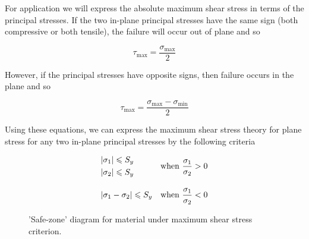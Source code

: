 \documentclass[
10pt,
a4paper,
openany,
svgnames,
]{book}
\begin{document}
For application we will express the absolute maximum shear stress in terms of the principal stresses. If the two in-plane principal stresses have the same sign (both compressive or both tensile), the failure will occur out of plane and so

\begin{equation}
  \tau _{\max } = \frac{\sigma _{\max }}{2}
\end{equation}

However, if the principal stresses have opposite signs, then failure occurs in the plane and so

\begin{equation}
  \tau _{\max } = \frac{\sigma_{\max } - \sigma _{\min }}{2}
\end{equation}

Using these equations, we can express the maximum shear stress theory for plane stress for any two in-plane principal stresses by the following criteria

\begin{equation}
  \begin{array}{l l}
    \begin{gathered}
      \left| \sigma_1 \right| \leqslant S_y \hfill \\
      \left| \sigma_2 \right| \leqslant S_y \hfill \\ 
    \end{gathered}  &\text{when } \dfrac{\sigma _1}{\sigma _2} > 0  \\[20pt]
    \left| \sigma _1 - \sigma _2 \right| \leqslant S_y &\text{when } \dfrac{\sigma _1}{\sigma _2} < 0 \\ 
  \end{array}
\end{equation}

\begin{figure}[h]
  \centering
  \caption{'Safe-zone' diagram for material under maximum shear stress criterion.}
  \label{fig: MSST safe zone}
\end{figure}
\end{document}
